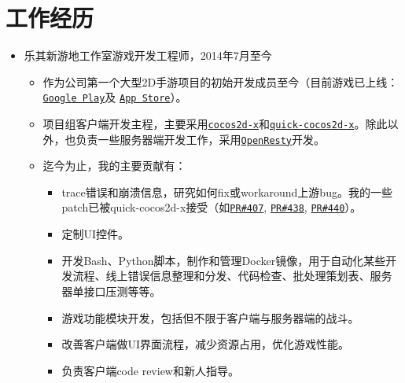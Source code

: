 \documentclass[letterpaper]{article}
\begin{document}
\section*{工作经历}
\begin{itemize}
    \item 乐其新游地工作室游戏开发工程师，2014年7月至今
        \begin{itemize}
            \item 作为公司第一个大型2D手游项目的初始开发成员至今（目前游戏已上线：
                \href{https://play.google.com/store/apps/details?id=com.game168.yysg}{\tt Google Play}及
                \href{https://itunes.apple.com/us/app/ye-ye-san-guo/id976517523?mt=8}{\tt App Store}）。
            \item 项目组客户端开发主程，主要采用\href{http://cocos2d-x.org/}{\tt cocos2d-x}和\href{https://github.com/dualface/v3quick}{\tt quick-cocos2d-x}。除此以外，也负责一些服务器端开发工作，采用\href{https://github.com/openresty/openresty}{\tt OpenResty}开发。
            \item 迄今为止，我的主要贡献有：
                \begin{itemize}
                    \item trace错误和崩溃信息，研究如何fix或workaround上游bug。我的一些patch已被quick-cocos2d-x接受（如\href{https://github.com/dualface/v3quick/pull/407}{\tt PR\#407}, \href{https://github.com/dualface/v3quick/pull/438}{\tt PR\#438}, \href{https://github.com/dualface/v3quick/pull/440}{\tt PR\#440}）。
                    \item 定制UI控件。
                    \item 开发Bash、Python脚本，制作和管理Docker镜像，用于自动化某些开发流程、线上错误信息整理和分发、代码检查、批处理策划表、服务器单接口压测等等。
                    \item 游戏功能模块开发，包括但不限于客户端与服务器端的战斗。
                    \item 改善客户端做UI界面流程，减少资源占用，优化游戏性能。
                    \item 负责客户端code review和新人指导。
                \end{itemize}
        \end{itemize}
\end{itemize}
\end{document}
